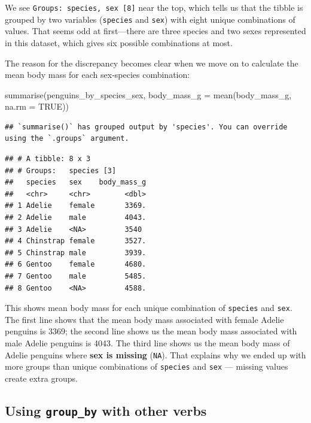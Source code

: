\documentclass[
]{book}
\newenvironment{Shaded}{\begin{snugshade}}{\end{snugshade}}
\newcommand{\AttributeTok}[1]{\textcolor[rgb]{0.77,0.63,0.00}{#1}}
\newcommand{\ConstantTok}[1]{\textcolor[rgb]{0.00,0.00,0.00}{#1}}
\newcommand{\FunctionTok}[1]{\textcolor[rgb]{0.00,0.00,0.00}{#1}}
\newcommand{\NormalTok}[1]{#1}
\begin{document}
We see \texttt{Groups:\ species,\ sex\ {[}8{]}} near the top, which tells us that the tibble is grouped by two variables (\texttt{species} and \texttt{sex}) with eight unique combinations of values. That seems odd at first---there are three species and two sexes represented in this dataset, which gives six possible combinations at most.

The reason for the discrepancy becomes clear when we move on to calculate the mean body mass for each sex-species combination:

\begin{Shaded}
\begin{Highlighting}[]
\FunctionTok{summarise}\NormalTok{(penguins\_by\_species\_sex, }
          \AttributeTok{body\_mass\_g =} \FunctionTok{mean}\NormalTok{(body\_mass\_g, }\AttributeTok{na.rm =} \ConstantTok{TRUE}\NormalTok{))}
\end{Highlighting}
\end{Shaded}

\begin{verbatim}
## `summarise()` has grouped output by 'species'. You can override using the `.groups` argument.
\end{verbatim}

\begin{verbatim}
## # A tibble: 8 x 3
## # Groups:   species [3]
##   species   sex    body_mass_g
##   <chr>     <chr>        <dbl>
## 1 Adelie    female       3369.
## 2 Adelie    male         4043.
## 3 Adelie    <NA>         3540 
## 4 Chinstrap female       3527.
## 5 Chinstrap male         3939.
## 6 Gentoo    female       4680.
## 7 Gentoo    male         5485.
## 8 Gentoo    <NA>         4588.
\end{verbatim}

This shows mean body mass for each unique combination of \texttt{species} and \texttt{sex}. The first line shows that the mean body mass associated with female Adelie penguins is 3369; the second line shows us the mean body mass associated with male Adelie penguins is 4043. The third line shows us the mean body mass of Adelie penguins where \textbf{sex is missing} (\texttt{NA}). That explains why we ended up with more groups than unique combinations of \texttt{species} and \texttt{sex} --- missing values create extra groups.

\hypertarget{using-group_by-with-other-verbs}{%
\subsection{\texorpdfstring{Using \texttt{group\_by} with other verbs}{Using group\_by with other verbs}}\label{using-group_by-with-other-verbs}}
\end{document}
